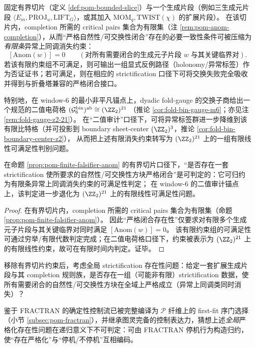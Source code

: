 \begin{proposition}\label{prop:pom-finite-falsifier-anom}
固定有界切片（定义 \ref{def:pom-bounded-slice}）与一个生成片段（例如三生成元片段 \(\langle E_m,\mathrm{PROJ}_u,\mathrm{LIFT}_G\rangle\)，或其加入 \(\mathrm{MOM}_q,\mathrm{TWIST}(\chi)\) 的扩展片段）。
在该切片内，completion 所需的 critical pairs 集合为有限集（注 \ref{rem:pom-anom-completion}），从而“严格自然性/可交换性闭合”存在的必要一致性条件可被压缩为\emph{有限条}异常上同调消失约束：
\[
[\mathrm{Anom}(w)] = 0\qquad(\text{对所有需要闭合的生成元子片段 }w\text{ 与其关键临界对}).
\]
若该有限约束组不可满足，则可输出一组显式反例路径（holonomy/异常标签）作为否证证书；若可满足，则在相应的 strictification 口径下可将交换失败完全吸收并得到与折叠塔兼容的严格闭合接口。
\par
特别地，在 window-\(6\) 的最小非平凡锚点上，dyadic fold-gauge 的交换子商给出一个规范的二值电荷格
\(
(\mathcal{G}^{\mathrm{bin}}_6)^{\mathrm{ab}}\cong (\ZZ_2)^{21}
\)
（推论 \ref{cor:fold-bin-gauge-m6}；亦见注 \ref{rem:fold-gauge-z2-21}）。
在“二值审计”口径下，可将异常标签群进一步降维到该有限比特格（并可投影到 boundary sheet-center \((\ZZ_2)^3\)，推论 \ref{cor:fold-bin-boundary-center-z2}），
从而把上述有限消失约束转写为 \((\ZZ_2)^{21}\) 上的一组有限线性可满足性判别问题。
\end{proposition}

\begin{corollary}\label{cor:pom-strictification-existence-decidable-bounded-slice}
在命题 \ref{prop:pom-finite-falsifier-anom} 的有界切片口径下，“是否存在一套 strictification 使所要求的自然性/可交换性方块严格闭合”是可判定的：它可归约为有限条异常上同调消失约束的可满足性判定；
在 window-\(6\) 的二值审计锚点上，该判定进一步退化为 \((\ZZ_2)^{21}\) 上的有限线性可满足性问题。
\end{corollary}
\begin{proof}
在有界切片内，completion 所需的 critical pairs 集合为有限集（命题 \ref{prop:pom-finite-falsifier-anom}）。
因此“严格闭合存在性”仅要求对有限多个生成元子片段与其关键临界对同时满足 \([\mathrm{Anom}(w)]=0\)。
该有限约束组的可满足性可通过穷举/有限代数判定完成；在二值电荷格口径下，约束被表示为 \((\ZZ_2)^{21}\) 上的有限线性约束，故可在有限时间内判定。证毕。
\end{proof}

\begin{conjecture}\label{conj:pom-global-strictification-undecidable}
移除有界切片约束后，考虑全局 strictification 存在性问题：给定一套扩展生成片段与其 completion 规则族，是否存在一组（可能非有限）strictification 数据，使所有需要闭合的自然性/可交换性方块在全域上严格成立（异常上同调类同时消失）？
\par
鉴于 FRACTRAN 的确定性控制流已被完整编译为 \(\mathcal{P}\) 纤维上的 first-fit 序门选择（小节 \ref{subsec:pom-fractran}），并继承图灵完备的控制表达力，猜想上述\emph{全局}严格化存在性问题在递归意义下不可判定：可由 FRACTRAN 停机行为构造归约，使“存在严格化”与“停机/不停机”互相编码。
\end{conjecture}

